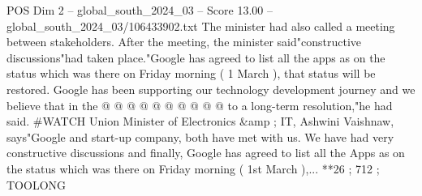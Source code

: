 \begin{textsample}{POS Dim 2 – global\_south\_2024\_03 – Score 13.00 – global\_south\_2024\_03/106433902.txt}
The minister had also called a meeting between stakeholders.
After the meeting, the minister said"constructive discussions"had taken place."Google has agreed to list all the apps as on the status which was there on Friday morning ( 1 March ), that status will be restored.
Google has been supporting our technology development journey and we believe that in the @ @ @ @ @ @ @ @ @ @ to a long-term resolution,"he had said. \#WATCH Union Minister of Electronics \&amp ; IT, Ashwini Vaishnaw, says"Google and start-up company, both have met with us.
We have had very constructive discussions and finally, Google has agreed to list all the Apps as on the status which was there on Friday morning ( 1st March ),... **26 ; 712 ; TOOLONG

\end{textsample}
